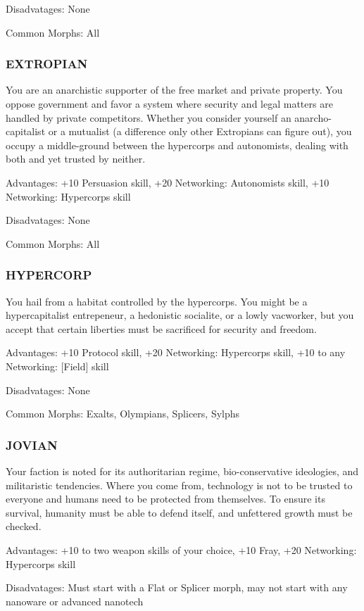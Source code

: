  Disadvatages: None

 Common Morphs: All

\subsubsection{EXTROPIAN}
You are an anarchistic supporter of the free market and private property. You oppose government and favor a system where security and legal matters are handled by private
competitors. Whether you consider yourself an anarcho-capitalist or a mutualist (a difference only other Extropians can figure out), you occupy a middle-ground between the hypercorps
and autonomists, dealing with both and yet trusted by neither.

 Advantages: +10 Persuasion skill, +20 Networking: Autonomists skill, +10 Networking: Hypercorps skill

 Disadvatages: None

 Common Morphs: All

\subsubsection{HYPERCORP}
You hail from a habitat controlled by the hypercorps. You might be a hypercapitalist entrepeneur, a hedonistic socialite, or a lowly vacworker, but you accept that certain liberties must be sacrificed for security and freedom.

 Advantages: +10 Protocol skill, +20 Networking: Hypercorps skill, +10 to any Networking: [Field] skill

 Disadvatages: None

 Common Morphs: Exalts, Olympians, Splicers, Sylphs

\subsubsection{JOVIAN}
Your faction is noted for its authoritarian regime, bio-conservative ideologies, and militaristic tendencies.
Where you come from, technology is not to be trusted to
everyone and humans need to be protected from themselves. To ensure its survival, humanity must be able to
defend itself, and unfettered growth must be checked.

 Advantages: +10 to two weapon skills of your choice,
+10 Fray, +20 Networking: Hypercorps skill

 Disadvatages: Must start with a Flat or Splicer
morph, may not start with any nanoware or advanced nanotech

